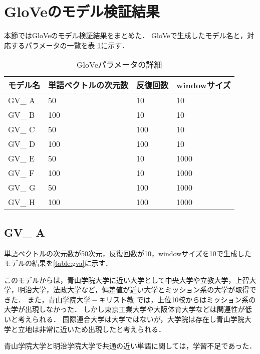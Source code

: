 \section{GloVeのモデル検証結果}
本節ではGloVeのモデル検証結果をまとめた．
GloVeで生成したモデル名と，対応するパラメータの一覧を表 \ref{table:gvResultAll}に示す．

\begin{table}[htbp]
\caption{GloVeパラメータの詳細}
\centering
\begin{tabular}{llll}
\hline
モデル名 & 単語ベクトルの次元数 & 反復回数 & windowサイズ
\\ \hline \hline
GV\_ A & 50 & 10 & 10\\ \hline
GV\_ B & 100 & 10 & 10\\ \hline
GV\_ C & 50 & 100 & 10\\ \hline
GV\_ D & 100 & 100 & 10\\ \hline
GV\_ E & 50 & 10 & 1000\\ \hline
GV\_ F & 100 & 10 & 1000\\ \hline
GV\_ G & 50 & 100 & 1000\\ \hline
GV\_ H & 100 & 100 & 1000\\ \hline
\end{tabular}
\label{table:gvResultAll}
\end{table}

\subsection{GV\_ A}
単語ベクトルの次元数が50次元，反復回数が10，windowサイズを10で生成したモデルの結果を\ref{table:gva}に示す．

このモデルからは，青山学院大学に近い大学として中央大学や立教大学，上智大学，明治大学，法政大学など，偏差値が近い大学とミッション系の大学が取得できた．
また，$ 青山学院大学 - キリスト教 $ では，上位10校からはミッション系の大学が出現しなかった．
しかし東京工業大学や大阪体育大学などは関連性が低いと考えられる．
国際連合大学は大学ではないが，大学院は存在し青山学院大学と立地は非常に近いため出現したと考えられる．

青山学院大学と明治学院大学で共通の近い単語に関しては，学習不足であった．

